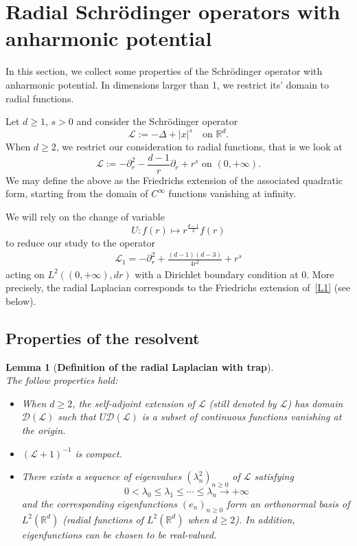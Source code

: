 \documentclass[%
11pt,  reqno]{amsart}
\newtheorem{lemma}[theorem]{Lemma}
\theoremstyle{remarkstyle}
\newcommand{\1}{\hspace{0.2mm}\text{I}\hspace{0.2mm}}
\newcommand{\R}{\mathbb{R}}
\renewcommand{\L}{\mathcal{L}}
\newcommand{\ld}{\lambda}
\numberwithin{equation}{section}
\numberwithin{theorem}{section}
\begin{document}
	
	\section{Radial Schr\"odinger operators with anharmonic potential}\label{sec:Schro}  
	
	In this section, we collect some properties of the Schr\"odinger operator with anharmonic potential. In dimensions larger than 1, we restrict its' domain to radial functions.
	
	Let $d\ge 1$, $s>0$ and consider the Schr\"odinger operator
	$$
	\L:=-\Delta + |x|^s \quad \text{on } \R^d.
	$$
	When $d\ge 2$, we restrict our consideration to radial functions, that is we look at 
	\begin{equation}\label{eq:RadLap} 
		\L := -\partial_r ^2 -\frac{d-1}{r} \partial_r +r^s \text{ on } (0,+\infty).
	\end{equation}
	We may define the above as the Friedrichs extension of the associated quadratic form, starting from the domain of $C^\infty$ functions vanishing at infinity. 
	
	We will rely on the change of variable
	\begin{equation}\label{eq:changerad}
		U: f(r) \mapsto r^{\frac{d-1}{2}} f(r)
	\end{equation}
	to reduce our study to the operator
	\begin{align} \label{L1}
		\L_1  = -\partial^2_r + \frac{(d-1)(d-3)}{4r^2} + r^s
	\end{align}
	acting on $L^2((0,+\infty),dr)$ with a Dirichlet boundary condition at $0$. More precisely, the radial Laplacian corresponds to the Friedrichs extension of~\eqref{L1} (see below).
	
	\subsection{Properties of the resolvent}
	
	
	\begin{lemma}[\textbf{Definition of the radial Laplacian with trap}]\label{LEM:main1}\mbox{}\\
		The follow properties hold:
		\begin{itemize}
			\item
			[\textup{(i)}] When $d\geq 2$, the self-adjoint extension of $\L$ (still denoted by $\L$) has domain $\mathcal{D} (\L)$ such that $U\mathcal{D} (\L)$ is a subset of continuous functions vanishing at the origin.
			\item
			[\textup{(ii)}] $(\L+1)^{-1}$ is compact.
			\item
			[\textup{(iii)}] There exists a sequence of eigenvalues $(\ld_n^2)_{n\ge 0}$ of $\L$ satisfying
			$$
			0<\ld_0 \le \ld_1 \le \cdots \le \ld_n \to +\infty
			$$ 
			and the corresponding eigenfunctions $(e_n)_{n\ge 0}$ form an orthonormal basis of $L^2(\R^d)$ (radial functions of $L^2(\R^d)$ when $d\ge 2$). In addition, eigenfunctions can be chosen to be real-valued.
		\end{itemize}
	\end{lemma}
	
\end{document}
